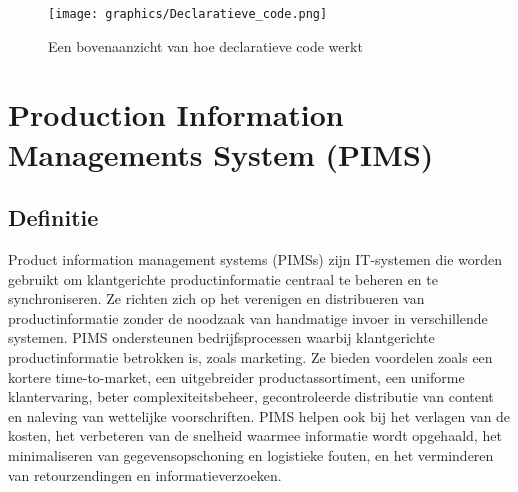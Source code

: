 \begin{figure}[!htb]
  \centering
  \texttt{[image: graphics/Declaratieve\_code.png]}
  \caption{Een bovenaanzicht van hoe declaratieve code werkt}
  \label{fig:gantt}
\end{figure}

\section{Production Information Managements System (PIMS)}
\subsection{Definitie}
\label{Definitie}

Product information management systems (PIMSs) zijn IT-systemen die worden gebruikt om klantgerichte productinformatie centraal te beheren en te synchroniseren. Ze richten zich op het verenigen en distribueren van productinformatie zonder de noodzaak van handmatige invoer in verschillende systemen. PIMS ondersteunen bedrijfsprocessen waarbij klantgerichte productinformatie betrokken is, zoals marketing. Ze bieden voordelen zoals een kortere time-to-market, een uitgebreider productassortiment, een uniforme klantervaring, beter complexiteitsbeheer, gecontroleerde distributie van content en naleving van wettelijke voorschriften. PIMS helpen ook bij het verlagen van de kosten, het verbeteren van de snelheid waarmee informatie wordt opgehaald, het minimaliseren van gegevensopschoning en logistieke fouten, en het verminderen van retourzendingen en informatieverzoeken.
\autocite{Battistello2021}
\par
